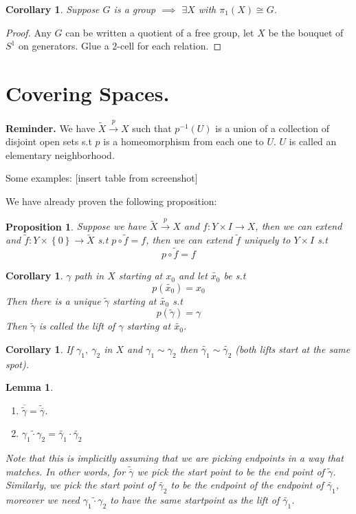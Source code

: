 \documentclass[11pt,a4paper]{article}
\theoremstyle{definition}
\theoremstyle{plain}
\newtheorem{lemma}[definition]{Lemma}
\newtheorem{proposition}[definition]{Proposition}
\newtheorem{corollary}[definition]{Corollary}
\theoremstyle{remark}
\renewcommand{\set}[1]{\left\{ #1 \right\}}
\newcommand{\1}{\mathbbm{1}}
\begin{document}
\begin{corollary}
    Suppose $G$ is a group $\implies$ $\exists X$ with $\pi_1(X) \cong G$.
\end{corollary}

\begin{proof}
    Any $G$ can be written a quotient of a free group, let $X$ be the bouquet of $S^1$ on generators. Glue a $2$-cell for each relation. 
\end{proof}

\section{Covering Spaces.}
\textbf{Reminder.} We have $\tilde{X} \xrightarrow{p} X$ such that 
$p^{-1}(U)$ is a union of a collection of disjoint open sets s.t $p$ is a homeomorphism from each one to $U$.
$U$ is called an elementary neighborhood. 

Some examples: 
[insert table from screenshot]


We have already proven the following proposition: 
\begin{proposition}
    Suppose we have $\tilde{X} \xrightarrow{p} X$ and $f \colon Y \times I \to X$, then we can extend 
    and $\tilde f \colon Y \times \set{0} \to \tilde{X}$ s.t $p \circ \tilde{f} = f$, then we can extend $\tilde{f}$ 
    uniquely to $Y \times I$ s.t
    $$p \circ \tilde f = f$$
\end{proposition}

\begin{corollary}
    $\gamma$ path in $X$ starting at $x_0$ and let $\tilde{x_0}$ be s.t 
    $$p(\tilde{x_0}) = x_0$$
    Then there is a unique $\tilde{\gamma}$ starting at $\tilde{x_0}$ s.t 
    $$p(\tilde{\gamma}) = \gamma$$
    Then $\tilde{\gamma}$ is called the lift of $\gamma$ starting at $\tilde{x_0}$. 
\end{corollary}

\begin{corollary}
    If $\gamma_1, \ \gamma_2$ in $X$ and $\gamma_1 \sim \gamma_2$ then $\tilde{\gamma_1} \sim \tilde{\gamma_2}$ 
    (both lifts start at the same spot).     
\end{corollary}

\begin{lemma}
    \begin{enumerate}
        \item $\overline{\tilde{\gamma}} = \tilde{\overline{\gamma}}$. 
        \item $\tilde{\gamma_1 \cdot \gamma_2} = \tilde{\gamma_1} \cdot \tilde{\gamma_2}$
    \end{enumerate}
    Note that this is implicitly assuming that we are picking endpoints in a way that matches. 
    In other words, for $\tilde{\overline{\gamma}}$ we pick the start point to be the end point of $\tilde{\gamma}$. 
    Similarly, we pick the start point of $\tilde{\gamma_2}$ to be the endpoint of the endpoint of $\tilde{\gamma_1}$, moreover 
    we need $\tilde{\gamma_1 \cdot \gamma_2}$ to have the same startpoint as the lift of $\tilde{\gamma_1}$.
\end{lemma}
\end{document}
